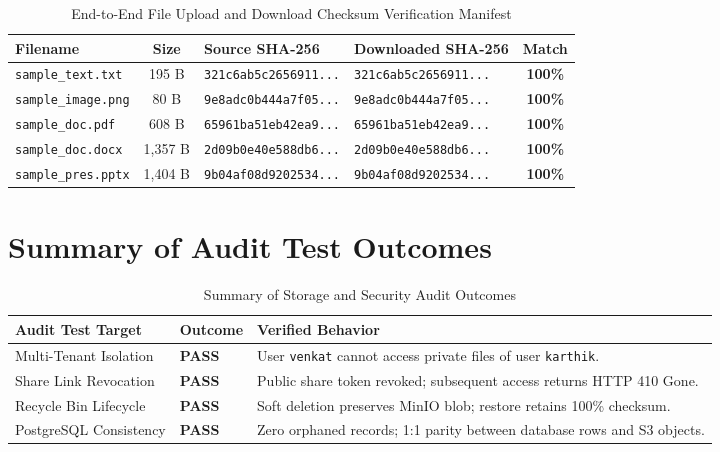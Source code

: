 \documentclass[11pt,a4paper]{report}
\begin{document}
\begin{table}[h!]
\centering
\small
\begin{tabularx}{\textwidth}{lcp{3.8cm}p{3.8cm}c}
\toprule
\textbf{Filename} & \textbf{Size} & \textbf{Source SHA-256} & \textbf{Downloaded SHA-256} & \textbf{Match} \\
\midrule
\texttt{sample\_text.txt} & 195 B & \texttt{321c6ab5c2656911...} & \texttt{321c6ab5c2656911...} & \textbf{100\%} \\
\texttt{sample\_image.png} & 80 B & \texttt{9e8adc0b444a7f05...} & \texttt{9e8adc0b444a7f05...} & \textbf{100\%} \\
\texttt{sample\_doc.pdf} & 608 B & \texttt{65961ba51eb42ea9...} & \texttt{65961ba51eb42ea9...} & \textbf{100\%} \\
\texttt{sample\_doc.docx} & 1,357 B & \texttt{2d09b0e40e588db6...} & \texttt{2d09b0e40e588db6...} & \textbf{100\%} \\
\texttt{sample\_pres.pptx} & 1,404 B & \texttt{9b04af08d9202534...} & \texttt{9b04af08d9202534...} & \textbf{100\%} \\
\bottomrule
\end{tabularx}
\caption{End-to-End File Upload and Download Checksum Verification Manifest}
\end{table}

\section{Summary of Audit Test Outcomes}
\begin{table}[h!]
\centering
\small
\begin{tabularx}{\textwidth}{llX}
\toprule
\textbf{Audit Test Target} & \textbf{Outcome} & \textbf{Verified Behavior} \\
\midrule
Multi-Tenant Isolation & \textbf{PASS} & User \texttt{venkat} cannot access private files of user \texttt{karthik}. \\
Share Link Revocation & \textbf{PASS} & Public share token revoked; subsequent access returns HTTP 410 Gone. \\
Recycle Bin Lifecycle & \textbf{PASS} & Soft deletion preserves MinIO blob; restore retains 100\% checksum. \\
PostgreSQL Consistency & \textbf{PASS} & Zero orphaned records; 1:1 parity between database rows and S3 objects. \\
\bottomrule
\end{tabularx}
\caption{Summary of Storage and Security Audit Outcomes}
\end{table}
\end{document}
